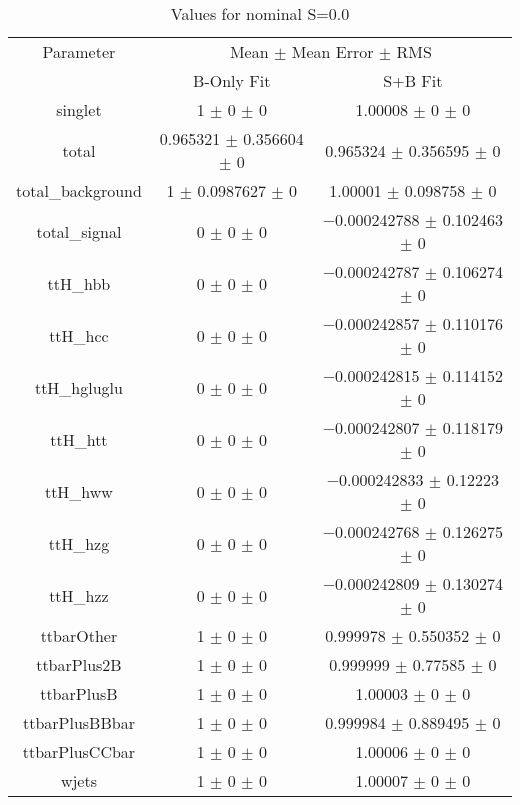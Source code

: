 \begin{table}
\centering
\caption{Values for nominal S=0.0}
\begin{tabular}{ccc}
\toprule
Parameter & \multicolumn{2}{c}{Mean $\pm$ Mean Error $\pm$ RMS}\\
 & B-Only Fit & S+B Fit\\
\midrule
singlet & \num{1} $\pm$ \num{0} $\pm$ \num{0} & \num{1.00008} $\pm$ \num{0} $\pm$ \num{0}\\
total & \num{0.965321} $\pm$ \num{0.356604} $\pm$ \num{0} & \num{0.965324} $\pm$ \num{0.356595} $\pm$ \num{0}\\
total\_background & \num{1} $\pm$ \num{0.0987627} $\pm$ \num{0} & \num{1.00001} $\pm$ \num{0.098758} $\pm$ \num{0}\\
total\_signal & \num{0} $\pm$ \num{0} $\pm$ \num{0} & \num{-0.000242788} $\pm$ \num{0.102463} $\pm$ \num{0}\\
ttH\_hbb & \num{0} $\pm$ \num{0} $\pm$ \num{0} & \num{-0.000242787} $\pm$ \num{0.106274} $\pm$ \num{0}\\
ttH\_hcc & \num{0} $\pm$ \num{0} $\pm$ \num{0} & \num{-0.000242857} $\pm$ \num{0.110176} $\pm$ \num{0}\\
ttH\_hgluglu & \num{0} $\pm$ \num{0} $\pm$ \num{0} & \num{-0.000242815} $\pm$ \num{0.114152} $\pm$ \num{0}\\
ttH\_htt & \num{0} $\pm$ \num{0} $\pm$ \num{0} & \num{-0.000242807} $\pm$ \num{0.118179} $\pm$ \num{0}\\
ttH\_hww & \num{0} $\pm$ \num{0} $\pm$ \num{0} & \num{-0.000242833} $\pm$ \num{0.12223} $\pm$ \num{0}\\
ttH\_hzg & \num{0} $\pm$ \num{0} $\pm$ \num{0} & \num{-0.000242768} $\pm$ \num{0.126275} $\pm$ \num{0}\\
ttH\_hzz & \num{0} $\pm$ \num{0} $\pm$ \num{0} & \num{-0.000242809} $\pm$ \num{0.130274} $\pm$ \num{0}\\
ttbarOther & \num{1} $\pm$ \num{0} $\pm$ \num{0} & \num{0.999978} $\pm$ \num{0.550352} $\pm$ \num{0}\\
ttbarPlus2B & \num{1} $\pm$ \num{0} $\pm$ \num{0} & \num{0.999999} $\pm$ \num{0.77585} $\pm$ \num{0}\\
ttbarPlusB & \num{1} $\pm$ \num{0} $\pm$ \num{0} & \num{1.00003} $\pm$ \num{0} $\pm$ \num{0}\\
ttbarPlusBBbar & \num{1} $\pm$ \num{0} $\pm$ \num{0} & \num{0.999984} $\pm$ \num{0.889495} $\pm$ \num{0}\\
ttbarPlusCCbar & \num{1} $\pm$ \num{0} $\pm$ \num{0} & \num{1.00006} $\pm$ \num{0} $\pm$ \num{0}\\
wjets & \num{1} $\pm$ \num{0} $\pm$ \num{0} & \num{1.00007} $\pm$ \num{0} $\pm$ \num{0}\\
\bottomrule
\end{tabular}
\end{table}